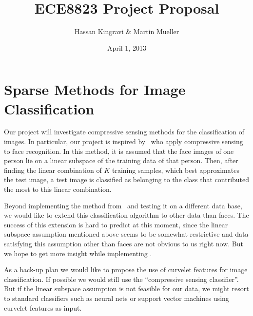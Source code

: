 \documentclass[12pt]{article} %
\title{ECE8823 Project Proposal}
\author{Hassan Kingravi \& Martin Mueller}
\date{April 1, 2013}
\begin{document}
\maketitle

\section*{Sparse Methods for Image Classification}
Our project will investigate compressive sensing methods for the classification of images. In particular, our project is inspired by~\cite{wright2009robust} who apply compressive sensing to face recognition. In this method, it is assumed that the face images of one person lie on a linear subspace of the training data of that person. Then, after finding the linear combination of $K$ training samples, which best approximates the test image, a test image is classified as belonging to the class that contributed the most to this linear combination.

Beyond implementing the method from~\cite{wright2009robust} and testing it on a different data base, we would like to extend this classification algorithm to other data than faces. The success of this extension is hard to predict at this moment, since the linear subspace assumption mentioned above seems to be somewhat restrictive and data satisfying this assumption other than faces are not obvious to us right now. But we hope to get more insight while implementing \cite{wright2009robust}.

As a back-up plan we would like to propose the use of curvelet features for image classification. If possible we would still use the ``compressive sensing classifier''. But if the linear subspace assumption is not feasible for our data, we might resort to standard classifiers such as neural nets or support vector machines using curvelet features as input.





\end{document}
